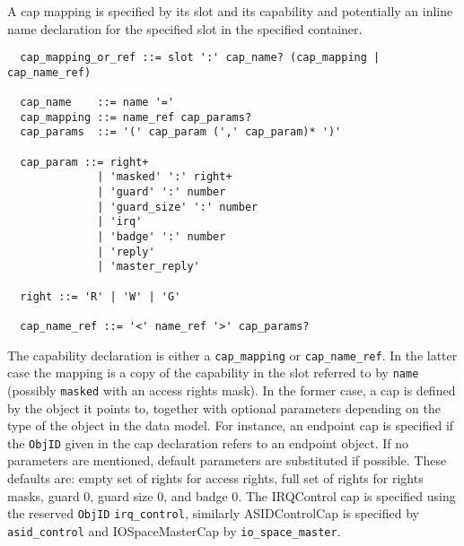 \documentclass[a4paper,11pt]{article}
\begin{document}
A cap mapping is specified by its slot and its capability and potentially an inline name declaration for the specified slot in the specified container. 

\begin{verbatim}
  cap_mapping_or_ref ::= slot ':' cap_name? (cap_mapping | cap_name_ref)

  cap_name    ::= name '='
  cap_mapping ::= name_ref cap_params?
  cap_params  ::= '(' cap_param (',' cap_param)* ')' 

  cap_param ::= right+
              | 'masked' ':' right+
              | 'guard' ':' number
              | 'guard_size' ':' number
              | 'irq'
              | 'badge' ':' number
              | 'reply'
              | 'master_reply'

  right ::= 'R' | 'W' | 'G'

  cap_name_ref ::= '<' name_ref '>' cap_params?
\end{verbatim}

The capability declaration is either a \texttt{cap\_mapping} or 
\texttt{cap\_name\_ref}. In the latter case the mapping is a copy of the 
capability in the slot referred to by \texttt{name} (possibly \texttt{masked} 
with an access rights mask). In the former case, a cap is defined by the object 
it points to, together with optional parameters depending on the type of the 
object in the data model. For instance, an endpoint cap is specified if the 
\texttt{ObjID} given in the cap declaration refers to an endpoint object. If no 
parameters are mentioned, default parameters are substituted if possible. These 
defaults are: empty set of rights for access rights, full set of rights for 
rights masks, guard 0, guard size 0, and badge 0. The IRQControl cap is 
specified using the reserved \texttt{ObjID} \texttt{irq\_control}, similarly 
ASIDControlCap is specified by \texttt{asid\_control} and IOSpaceMasterCap by 
\texttt{io\_space\_master}.

\end{document}
